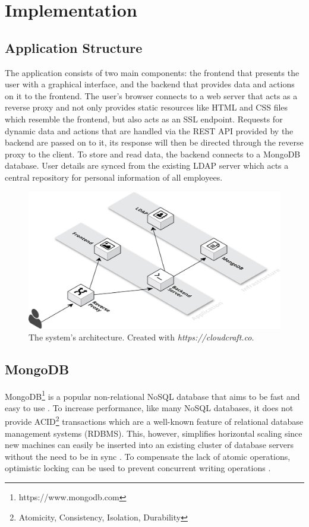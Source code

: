 \chapter{Implementation}
\section{Application Structure}
The application consists of two main components: the frontend that presents the user with a graphical interface, and the backend that provides data and actions on it to the frontend.
The user's browser connects to a web server that acts as a reverse proxy and not only provides static resources like HTML and CSS files which resemble the frontend, but also acts as an SSL endpoint.
Requests for dynamic data and actions that are handled via the REST API provided by the backend are passed on to it, its response will then be directed through the reverse proxy to the client.
To store and read data, the backend connects to a MongoDB database. User details are synced from the existing LDAP server which acts a central repository for personal information of all employees.
\begin{figure}[H]
    \centering
    \includegraphics[width=\textwidth]{images/system_architecture.png}
    \caption[Illustration: System Architecture]{The system's architecture. Created with \textit{https://cloudcraft.co}.}
    \label{fig:markovchain}
\end{figure}

\newpage

\section{MongoDB}
MongoDB\footnote{https://www.mongodb.com} is a popular non-relational NoSQL database that aims to be fast and easy to use \cite[p. 10]{MongoGuide}. To increase performance, like many NoSQL databases, it does not provide ACID\footnote{Atomicity, Consistency, Isolation, Durability} transactions which are a well-known feature of relational database management systems (RDBMS). This, however, simplifies horizontal scaling since new machines can easily be inserted into an existing cluster of database servers without the need to be in sync \cite[p. 3]{MongoGuide}. To compensate the lack of atomic operations, optimistic locking can be used to prevent concurrent writing operations \cite{MongoLock}.

